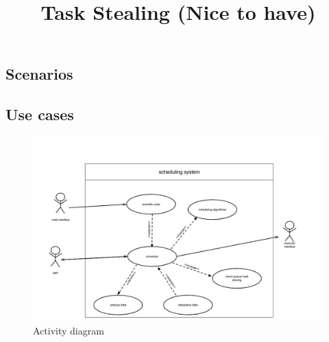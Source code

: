 \subsection{Scenarios}
\subsection{Use cases}

	\begin{figure}
		\includegraphics[width=1.5\textwidth,scale=0.75,trim=7cm 0 -7cm 0]{images/usecasediagram.png}
		\caption{Activity diagram}
	\end{figure}

\title{Task Stealing (Nice to have)}

